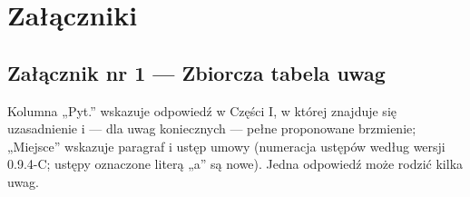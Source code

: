 \documentclass[12pt,a4paper]{report}
\newcounter{paragraf}
\begin{document}

\clearpage
\chapter*{Załączniki}

\section*{Załącznik nr 1 --- Zbiorcza tabela uwag}

Kolumna „Pyt.” wskazuje odpowiedź w Części I, w której znajduje się uzasadnienie i --- dla uwag koniecznych --- pełne proponowane brzmienie; „Miejsce” wskazuje paragraf i ustęp umowy (numeracja ustępów według wersji 0.9.4-C; ustępy oznaczone literą „a” są nowe). Jedna odpowiedź może rodzić kilka uwag.
\end{document}
